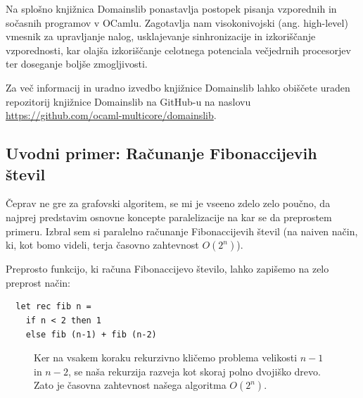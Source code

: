 \documentclass[mat1, tisk]{fmfdelo}
\begin{document}
Na splošno knjižnica Domainslib ponastavlja postopek pisanja vzporednih in sočasnih programov v OCamlu. 
Zagotavlja nam visokonivojski (ang. high-level) vmesnik za upravljanje nalog, usklajevanje sinhronizacije in
izkoriščanje vzporednosti, kar olajša izkoriščanje celotnega potenciala večjedrnih procesorjev ter doseganje boljše
zmogljivosti.

Za več informacij in uradno izvedbo knjižnice Domainslib lahko obiščete uraden repozitorij knjižnice Domainslib na
GitHub-u na naslovu \url{https://github.com/ocaml-multicore/domainslib}.


\subsection{Uvodni primer: Računanje Fibonaccijevih števil}

Čeprav ne gre za grafovski algoritem, se mi je vseeno zdelo zelo poučno, da najprej predstavim osnovne koncepte
paralelizacije na kar se da preprostem primeru. Izbral sem si paralelno računanje Fibonaccijevih števil
(na naiven način, ki, kot bomo videli, terja časovno zahtevnost $O(2^n)$).

Preprosto funkcijo, ki računa Fibonaccijevo število, lahko zapišemo na zelo preprost način:

\begin{lstlisting}
  let rec fib n =
    if n < 2 then 1
    else fib (n-1) + fib (n-2)
\end{lstlisting}

\begin{figure}[htb]
  \centering
  \caption{Ker na vsakem koraku rekurzivno kličemo problema velikosti $n-1$ in $n-2$, se naša rekurzija razveja
  kot skoraj polno dvojiško drevo. Zato je časovna zahtevnost našega algoritma $O(2^n)$.}
  \label{fig:fib-graph}
\end{figure}
\end{document}
